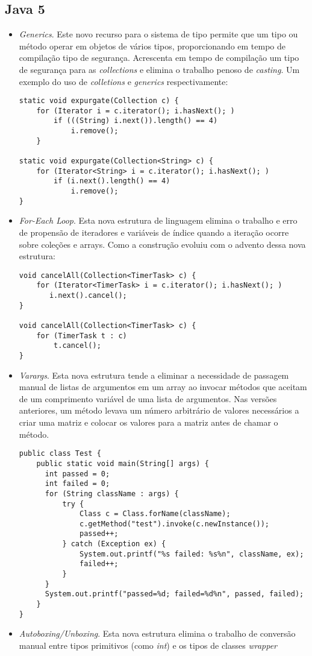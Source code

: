	\subsection {Java 5}
	  \begin{itemize}
		  \item {\it Generics}\cite{JSE8_Enhancements, OracleGenerics,Parnin:2011:JGA:1985441.1985446}. Este novo recurso para o sistema de tipo permite que um tipo ou método operar em objetos de vários tipos, proporcionando em tempo de compilação tipo de segurança. Acrescenta em tempo de compilação um tipo de segurança para as {\it collections} e elimina o trabalho penoso de {\it casting}. Um exemplo do uso de {\it colletions} e {\it generics} respectivamente:
\begin{lstlisting}
static void expurgate(Collection c) {
	for (Iterator i = c.iterator(); i.hasNext(); )
		if (((String) i.next()).length() == 4)
			i.remove();
	}
	
static void expurgate(Collection<String> c) {
	for (Iterator<String> i = c.iterator(); i.hasNext(); )
		if (i.next().length() == 4)
			i.remove();
}
\end{lstlisting}
		  
		\item {\it For-Each Loop}. Esta nova estrutura de linguagem elimina o trabalho e erro de propensão de iteradores e variáveis de índice quando a iteração ocorre sobre coleções e arrays. Como a construção evoluiu com o advento dessa nova estrutura:
	
\begin{lstlisting}
void cancelAll(Collection<TimerTask> c) {
	for (Iterator<TimerTask> i = c.iterator(); i.hasNext(); )
	   i.next().cancel();
}
	
void cancelAll(Collection<TimerTask> c) {
	for (TimerTask t : c)
		t.cancel();
}
\end{lstlisting}
	  
	  \clearpage
	  \item {\it Varargs}. Esta nova estrutura tende a eliminar a necessidade de passagem manual de listas de argumentos em um array ao invocar métodos que aceitam de um comprimento variável de uma lista de argumentos. Nas versões anteriores, um método levava um número arbitrário de valores necessários a  criar uma matriz e colocar os valores para a matriz antes de chamar o método.


\begin{lstlisting}
public class Test {
	public static void main(String[] args) {
	  int passed = 0;
	  int failed = 0;
	  for (String className : args) {
	      try {
	          Class c = Class.forName(className);
	          c.getMethod("test").invoke(c.newInstance());
	          passed++;
	      } catch (Exception ex) {
	          System.out.printf("%s failed: %s%n", className, ex);
	          failed++;
	      }
	  }
	  System.out.printf("passed=%d; failed=%d%n", passed, failed);
	}
}
\end{lstlisting}
 
	  \item {\it Autoboxing/Unboxing}. Esta nova estrutura elimina o trabalho de conversão manual entre tipos primitivos (como {\it int}) e os tipos de classes {\it wrapper}
  \end{itemize}
  

